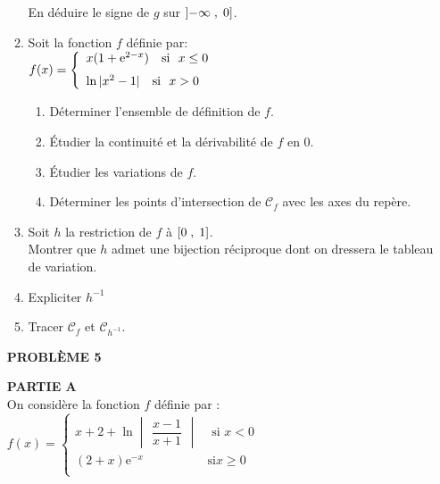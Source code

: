 \begin{enumerate}
\begin{enumerate}
En  déduire le signe de $ g $  sur $ \left]-\infty \;, \;0\right] $.

\item  Soit la fonction $ f $ définie par: \\ 

  $f(x)=\left \{\begin{array}{l} x(1+\mathrm{e}^{2-x})~~~ \textrm{si}~~ x  \leq 0 ~\\ [0.23cm]
   \ln|x^{2}-1|~~~ \textrm{si}~~ x > 0 \end{array}\right.$


\begin{enumerate}

\item Déterminer l'ensemble de définition de $ f $.
\item Étudier la continuité et  la dérivabilité de $ f $  en $ 0 $.
\item Étudier les variations de $ f $. 
\item Déterminer les points d'intersection de $\mathscr{C}_{f}$  avec les axes du repère.
\end{enumerate}
\item Soit $ h $  la restriction de $ f $ à $ \left[0\;,\; 1\right] $.\\ Montrer que $ h $  admet une bijection  réciproque dont on dressera le tableau de variation.

\item Expliciter $ h^{-1} $
\item Tracer $\mathscr{C}_{f}$  et $\mathscr{C}_{h^{-1}}$.
\end{enumerate}

\vspace{0,5cm}

\textbf{PROBLÈME 5}

\vspace{0,2cm}

 \textbf{ PARTIE A}\\ 
   On considère  la fonction $ f $ définie par :\\ $f(x)=\begin{cases}  
x+2 +\ln\begin{vmatrix}\dfrac{x-1}{x+1}\end{vmatrix} & \text{ si } x < 0 \\

(2+x)\text{e}^{-x}  & \text{si}  x\geq 0 \\ 
\end{cases} $ \medskip


\end{enumerate}
